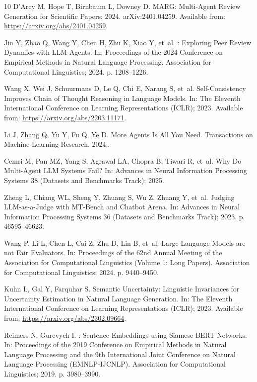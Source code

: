 \documentclass[10pt,letterpaper]{article}
\begin{document}
\begin{thebibliography}{10}
D'Arcy M, Hope T, Birnbaum L, Downey D. {MARG}: Multi-Agent Review Generation
  for Scientific Papers; 2024.
\newblock arXiv:2401.04259.
\newblock Available from: \url{https://arxiv.org/abs/2401.04259}.

Jin Y, Zhao Q, Wang Y, Chen H, Zhu K, Xiao Y, et~al.
: Exploring Peer Review Dynamics with {LLM} Agents.
\newblock In: Proceedings of the 2024 Conference on Empirical Methods in
  Natural Language Processing. Association for Computational Linguistics; 2024.
  p. 1208--1226.

Wang X, Wei J, Schuurmans D, Le Q, Chi E, Narang S, et~al.
\newblock Self-Consistency Improves Chain of Thought Reasoning in Language
  Models.
\newblock In: The Eleventh International Conference on Learning Representations
  (ICLR); 2023. Available from: \url{https://arxiv.org/abs/2203.11171}.

Li J, Zhang Q, Yu Y, Fu Q, Ye D.
\newblock More Agents Is All You Need.
\newblock Transactions on Machine Learning Research. 2024;.

Cemri M, Pan MZ, Yang S, Agrawal LA, Chopra B, Tiwari R, et~al.
\newblock Why Do Multi-Agent {LLM} Systems Fail?
\newblock In: Advances in Neural Information Processing Systems 38 (Datasets
  and Benchmarks Track); 2025.

Zheng L, Chiang WL, Sheng Y, Zhuang S, Wu Z, Zhuang Y, et~al.
\newblock Judging {LLM}-as-a-Judge with {MT-Bench} and {Chatbot Arena}.
\newblock In: Advances in Neural Information Processing Systems 36 (Datasets
  and Benchmarks Track); 2023. p. 46595--46623.

Wang P, Li L, Chen L, Cai Z, Zhu D, Lin B, et~al.
\newblock Large Language Models are not Fair Evaluators.
\newblock In: Proceedings of the 62nd Annual Meeting of the Association for
  Computational Linguistics (Volume 1: Long Papers). Association for
  Computational Linguistics; 2024. p. 9440--9450.

Kuhn L, Gal Y, Farquhar S.
\newblock Semantic Uncertainty: Linguistic Invariances for Uncertainty
  Estimation in Natural Language Generation.
\newblock In: The Eleventh International Conference on Learning Representations
  (ICLR); 2023. Available from: \url{https://arxiv.org/abs/2302.09664}.

Reimers N, Gurevych I.
: Sentence Embeddings using {Siamese} {BERT}-Networks.
\newblock In: Proceedings of the 2019 Conference on Empirical Methods in
  Natural Language Processing and the 9th International Joint Conference on
  Natural Language Processing (EMNLP-IJCNLP). Association for Computational
  Linguistics; 2019. p. 3980--3990.


\end{thebibliography}
\end{document}
